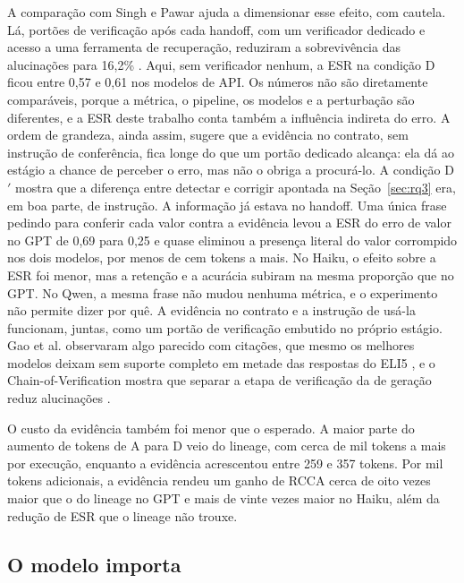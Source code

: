 A comparação com Singh e Pawar ajuda a dimensionar esse efeito, com cautela.
Lá, portões de verificação após cada handoff, com um verificador dedicado e acesso a uma ferramenta de recuperação, reduziram a sobrevivência das alucinações para 16,2\% \cite{singh2026snowball}.
Aqui, sem verificador nenhum, a ESR na condição D ficou entre 0,57 e 0,61 nos modelos de API.
Os números não são diretamente comparáveis, porque a métrica, o pipeline, os modelos e a perturbação são diferentes, e a ESR deste trabalho conta também a influência indireta do erro. A ordem de grandeza, ainda assim, sugere que a evidência no contrato, sem instrução de conferência, fica longe do que um portão dedicado alcança: ela dá ao estágio a chance de perceber o erro, mas não o obriga a procurá-lo.
A condição D$'$ mostra que a diferença entre detectar e corrigir apontada na Seção~\ref{sec:rq3} era, em boa parte, de instrução. A informação já estava no handoff. Uma única frase pedindo para conferir cada valor contra a evidência levou a ESR do erro de valor no GPT de 0,69 para 0,25 e quase eliminou a presença literal do valor corrompido nos dois modelos, por menos de cem tokens a mais. No Haiku, o efeito sobre a ESR foi menor, mas a retenção e a acurácia subiram na mesma proporção que no GPT. No Qwen, a mesma frase não mudou nenhuma métrica, e o experimento não permite dizer por quê. A evidência no contrato e a instrução de usá-la funcionam, juntas, como um portão de verificação embutido no próprio estágio.
Gao et al. observaram algo parecido com citações, que mesmo os melhores modelos deixam sem suporte completo em metade das respostas do ELI5 \cite{gao2023citations}, e o Chain-of-Verification mostra que separar a etapa de verificação da de geração reduz alucinações \cite{dhuliawala2023cove}.

O custo da evidência também foi menor que o esperado.
A maior parte do aumento de tokens de A para D veio do lineage, com cerca de mil tokens a mais por execução, enquanto a evidência acrescentou entre 259 e 357 tokens.
Por mil tokens adicionais, a evidência rendeu um ganho de RCCA cerca de oito vezes maior que o do lineage no GPT e mais de vinte vezes maior no Haiku, além da redução de ESR que o lineage não trouxe.

\subsection{O modelo importa}\label{sec:disc-modelo}

